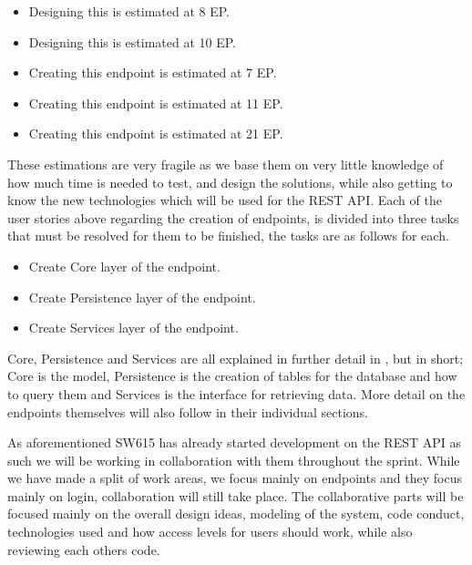 \begin{itemize}[style=unboxed]
	\item {} 
	Designing this is estimated at 8 EP.
	\item {}
	Designing this is estimated at 10 EP.
	\item {}
	Creating this endpoint is estimated at 7 EP.
	\item {}
	Creating this endpoint is estimated at 11 EP.
	\item {}
	Creating this endpoint is estimated at 21 EP.
\end{itemize}
These estimations are very fragile as we base them on very little knowledge of how much time is needed to test, and design the solutions, while also getting to know the new technologies which will be used for the REST API.
Each of the user stories above regarding the creation of endpoints, is divided into three tasks that must be resolved for them to be finished, the tasks are as follows for each.
\begin{itemize}
    \item Create Core layer of the endpoint.
    \item Create Persistence layer of the endpoint.
    \item Create Services layer of the endpoint.
\end{itemize}
Core, Persistence and Services are all explained in further detail in \myref{}, but in short; Core is the model, Persistence is the creation of tables for the database and how to query them and Services is the interface for retrieving data.
More detail on the endpoints themselves will also follow in their individual sections.

As aforementioned SW615 has already started development on the REST API as such we will be working in collaboration with them throughout the sprint.
While we have made a split of work areas, we focus mainly on endpoints and they focus mainly on login, collaboration will still take place.
The collaborative parts will be focused mainly on the overall design ideas, modeling of the system, code conduct, technologies used and how access levels for users should work, while also reviewing each others code.

